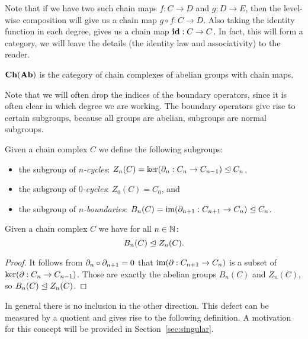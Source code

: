 Note that if we have two such chain maps $f:C \to D$ and $g:D \to E$, then the level-wise composition will give us a chain map $g \circ f: C \to D$. Also taking the identity function in each degree, gives us a chain map $\mathbf{id} : C \to C$. In fact, this will form a category, we will leave the details (the identity law and associativity) to the reader.

\begin{definition}
	$\mathbf{Ch}(\mathbf{Ab})$ is the category of chain complexes of abelian groups with chain maps.
\end{definition}

Note that we will often drop the indices of the boundary operators, since it is often clear in which degree we are working. The boundary operators give rise to certain subgroups, because all groups are abelian, subgroups are normal subgroups.

\begin{definition}
	\label{def:cycles}
	Given a chain complex $C$ we define the following subgroups:
	\begin{itemize}
		\item the subgroup of \emph{$n$-cycles}: $Z_n(C) = \ker(\partial_n: C_n \to C_{n-1}) \trianglelefteq C_n$,
		\item the subgroup of \emph{$0$-cycles}: $Z_0(C) = C_0$, and
		\item the subgroup of \emph{$n$-boundaries}: $B_n(C) = \operatorname{im}(\partial_{n+1}: C_{n+1} \to C_n) \trianglelefteq C_n$.
	\end{itemize}
\end{definition}
\begin{lemma}
	Given a chain complex $C$ we have for all $n \in \mathbb{N}$:
	$$ B_n(C) \trianglelefteq Z_n(C).$$
\end{lemma}
\begin{proof}
	It follows from $\partial_n \circ \partial_{n+1} = 0$ that $\operatorname{im}(\partial: C_{n+1} \to C_n)$ is a subset of $\ker(\partial: C_n \to C_{n-1})$. Those are exactly the abelian groups $B_n(C)$ and $Z_n(C)$, so $ B_n(C) \trianglelefteq Z_n(C) $.
\end{proof}

In general there is no inclusion in the other direction. This defect can be measured by a quotient and gives rise to the following definition. A motivation for this concept will be provided in Section~\ref{sec:singular}.

